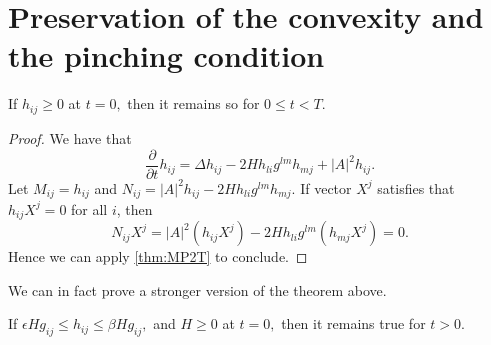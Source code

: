 \section{Preservation of the convexity and the pinching condition}
\begin{theorem}
	If $h_{ij}^{} \geq 0 $ at $t=0,$ then it remains so for $0 \leq t < T.$ 
\end{theorem}
\begin{proof}
	We have that \[\frac{\partial }{\partial t} h_{ij}^{} = \Delta h_{ij}^{} - 2 H h_{li }^{} g_{}^{lm } h_{mj}^{} + \left| A \right| ^2 h_{ij}^{}.\]
	Let $M_{ij }^{} = h_{ij }^{} $ and $N_{ij }^{} = \left| A \right| ^2 h_{ij }^{} - 2 H h_{li }^{} g_{}^{lm } h_{mj}^{}.$
	If vector $X^j$ satisfies that $h_{ij }^{} X^j=0$ for all $i$, then
	\[N_{ij }^{} X^j = \left| A \right| ^2 (h_{ij }^{} X^j) - 2 H h_{li }^{} g_{}^{lm } (h_{mj}^{}X^j)=0.\]
	Hence we can apply \autoref{thm:MP2T} to conclude.
\end{proof}
We can in fact prove a stronger version of the theorem above.
\begin{theorem} \label{stpin}
	If $\epsilon H g_{ij }^{} \leq h_{ij }^{} \leq \beta H g_{ij }^{} ,$ and $H \geq 0$ at $t=0,$ then it remains true for $t>0$.
\end{theorem}
